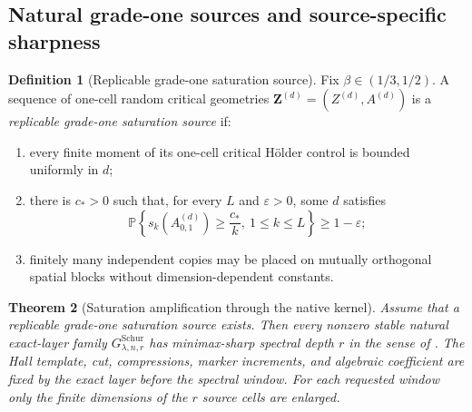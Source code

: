 \documentclass[10pt,reqno]{amsart}
\theoremstyle{plain}
\newtheorem{theorem}{Theorem}[section]
\theoremstyle{definition}
\newtheorem{definition}[theorem]{Definition}
\theoremstyle{remark}
\begin{document}
\subsection{Natural grade-one sources and source-specific sharpness}
\label{hall:subsec-natural-sources}

\begin{definition}[Replicable grade-one saturation source]
\label{cc:def-replicable-grade-one-source}
Fix $\beta\in(1/3,1/2)$.  A sequence of one-cell random critical geometries
$\mathbf Z^{(d)}=(Z^{(d)},A^{(d)})$ is a \emph{replicable grade-one
saturation source} if:
\begin{enumerate}[label=\textup{(\roman*)},leftmargin=2.7em]
\item every finite moment of its one-cell critical H\"older control is
      bounded uniformly in $d$;
\item there is $c_*>0$ such that, for every $L$ and $\varepsilon>0$, some
      $d$ satisfies
      \begin{equation}
       \mathbb P\left\{s_k(A^{(d)}_{0,1})\ge\frac{c_*}{k},
                 \ 1\le k\le L\right\}\ge1-\varepsilon;
       \label{cc:eq-grade-one-edge-certificate}
      \end{equation}
\item finitely many independent copies may be placed on mutually orthogonal
      spatial blocks without dimension-dependent constants.
\end{enumerate}
\end{definition}



\begin{theorem}[Saturation amplification through the native kernel]
\label{cc:thm-saturation-amplification}
Assume that a replicable grade-one saturation source exists.  Then every
nonzero stable natural exact-layer family
$G^{\mathrm{Schur}}_{\lambda,n,r}$ has minimax-sharp spectral depth $r$ in
the sense of .  The Hall template,
cut, compressions, marker increments, and algebraic coefficient are fixed by
the exact layer before the spectral window.  For each requested window only
the finite dimensions of the $r$ source cells are enlarged.
\end{theorem}
\end{document}
